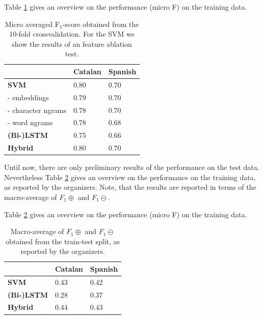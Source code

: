 \documentclass[11pt]{article}
\begin{document}
Table \ref{table:Performance_iberstance_train} gives an overview on the performance (micro F) on the training data.
\begin{table}[]
\centering
\begin{tabular}{lll}
                                          & \textbf{Catalan} & \textbf{Spanish} \\
                                          \toprule
\textbf{SVM}                              &    0.80              &    0.70              \\
{\color[HTML]{656565} - embeddings}       &     0.79             &    0.70             \\
{\color[HTML]{656565} - character ngrams} &     0.78             &    0.70              \\
{\color[HTML]{656565} - word ngrams}      &     0.78             &    0.68             \\
\textbf{(Bi-)LSTM}                        &     0.75             &     0.66             \\
\textbf{Hybrid}                         &     0.80             &     0.70          \\
\bottomrule      
\end{tabular}
\caption{Micro averaged F$_1$-score obtained from the 10-fold crossvalidation. For the SVM we show the results of an feature ablation test.}
\label{table:Performance_iberstance_train}
\end{table}

Until now, there are only preliminary results of the performance on the test data.
Nevertheless Table \ref{table:Performance_iberstance_test} gives an overview on the performance on the training data, as reported by the organizers.
Note, that the results are reported in terms of the macro-average of $F_1\oplus$ and $F_1\ominus$.


Table \ref{table:Performance_iberstance_test} gives an overview on the performance (micro F) on the training data.
\begin{table}[]
\centering
\begin{tabular}{lll}
                                          & \textbf{Catalan} & \textbf{Spanish} \\
                                          \toprule
\textbf{SVM}                              &    0.43             &    0.42              \\
\textbf{(Bi-)LSTM}                        &     0.28             &     0.37             \\
\textbf{Hybrid}                         &     0.44             &       0.43        \\
\bottomrule      
\end{tabular}
\caption{Macro-average of $F_1\oplus$ and $F_1\ominus$ obtained from the train-test split, as reported by the organizers.}
\label{table:Performance_iberstance_test}
\end{table}
\end{document}
